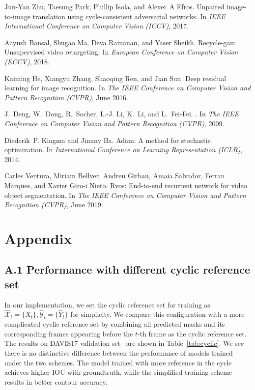 \documentclass{article}
\begin{document}
{\begin{thebibliography}{10}
Jun-Yan Zhu, Taesung Park, Phillip Isola, and Alexei~A Efros.
\newblock Unpaired image-to-image translation using cycle-consistent
  adversarial networks.
\newblock In {\em IEEE International Conference on Computer Vision (ICCV)},
  2017.

Aayush Bansal, Shugao Ma, Deva Ramanan, and Yaser Sheikh.
\newblock Recycle-gan: Unsupervised video retargeting.
\newblock In {\em European Conference on Computer Vision (ECCV)}, 2018.

Kaiming He, Xiangyu Zhang, Shaoqing Ren, and Jian Sun.
\newblock Deep residual learning for image recognition.
\newblock In {\em The IEEE Conference on Computer Vision and Pattern
  Recognition (CVPR)}, June 2016.

J.~Deng, W.~Dong, R.~Socher, L.-J. Li, K.~Li, and L.~Fei-Fei.
.
\newblock In {\em The IEEE Conference on Computer Vision and Pattern
  Recognition (CVPR)}, 2009.

Diederik~P. Kingma and Jimmy Ba.
\newblock Adam: A method for stochastic optimization.
\newblock In {\em International Conference on Learning Representation (ICLR)},
  2014.

Carles Ventura, Miriam Bellver, Andreu Girbau, Amaia Salvador, Ferran Marques,
  and Xavier Giro-i Nieto.
\newblock Rvos: End-to-end recurrent network for video object segmentation.
\newblock In {\em The IEEE Conference on Computer Vision and Pattern
  Recognition (CVPR)}, June 2019.

\end{thebibliography}

}

\newpage

\section*{Appendix}

\subsection*{A.1 Performance with different cyclic reference set}
In our implementation, we set the cyclic reference set for training as $\widehat{\mathcal{X}}_t=\{X_t\}, \widehat{\mathcal{Y}}_t=\{\widehat{Y}_t\}$ for simplicity. We compare this configuration with a more complicated cyclic reference set by combining all predicted masks and its corresponding frames appearing before the $t$-th frame as the cyclic reference set. The results on DAVIS17 validation set~\cite{Pont-Tuset_arXiv_2017} are shown in Table~\ref{tab:cyclic}. We see there is no distinctive difference between the performance of models trained under the two schemes. The model trained with more reference in the cycle achieves higher IOU with groundtruth, while the simplified training scheme results in better contour accuracy.
\end{document}
